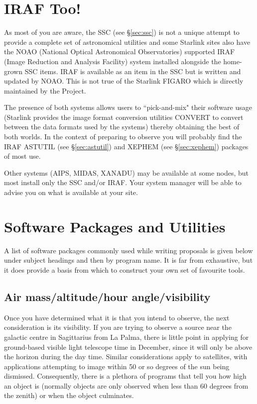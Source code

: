 \documentclass[twoside,11pt]{article}
\newcommand{\htmladdnormallink}[2]{#1}
\newcommand{\xref}[3]{#1}
\newcommand{\xlabel}[1]{}
\newcommand{\AIPSref}{\xref{AIPS}{sun207}{}}
\newcommand{\FIGAROref}{\xref{FIGARO}{sun86}{}}
\newcommand{\IRAFref}{\htmladdnormallink{IRAF}{http://www.starlink.ac.uk/iraf/}}
\newcommand{\NOAOref}{\htmladdnormallink{NOAO}{http://www.noao.edu/}}
\newcommand{\MIDASref}{\htmladdnormallink{MIDAS}{http://http.hq.eso.org/midas-info/midas.html}}
\newcommand{\STARLINKref}{\htmladdnormallink{Starlink}{http://www.starlink.ac.uk/}}
\newcommand{\CONVERTref}{\xref{CONVERT}{sun55}{}}
\newcommand{\SSCref}{\xref{SSC}{sun1}{}}
\newcommand{\XANADUref}{\htmladdnormallink{XANADU}{http://heasarc.gsfc.nasa.gov/docs/xanadu/xanadu.html}}
\begin{document}
\section{IRAF Too!} \xlabel{IRAF}
\label{sec:iraf}

As most of you are aware, the {\SSCref} (see \S{\ref{sec:ssc}}) is not a unique attempt to provide
a complete set of astronomical utilities and some {\STARLINKref} sites also have the
{\NOAOref} (National Optical Astronomical Observatories) supported {\IRAFref}
(Image Reduction and Analysis Facility) system installed alongside the home-grown SSC
items. IRAF is available as an item in the SSC but is written and updated
by NOAO. This is not true of the Starlink {\FIGAROref} which is directly maintained
by the Project.

The presence of both systems allows users to ``pick-and-mix" their
software usage (Starlink provides the image format conversion utilities
{\CONVERTref} to convert between the data formats used by the systems)
thereby obtaining the best of both worlds. In the context
of preparing to observe you will probably find the IRAF ASTUTIL (see \S{\ref{sec:astutil}})
and XEPHEM (see \S{\ref{sec:xephem}}) packages of most use.

Other systems ({\AIPSref}, {\MIDASref}, {\XANADUref}) may be available
at some nodes, but most install only the SSC and/or IRAF. Your system manager
will be able to advise you on what is available at your site.


\section{Software Packages and Utilities} \xlabel{PACKAGES}
\label{sec:packages}

A list of software packages commonly used while writing proposals is given
below under subject headings and then by program name. It is far from
exhaustive, but it does provide a basis from which to construct your own
set of favourite tools.

\subsection{Air mass/altitude/hour angle/visibility} \xlabel{AIRMASS}
\label{sec:airmass}

Once you have determined what it is that you intend to observe, the
next consideration is its visibility. If you are trying to observe
a source near the galactic centre in Sagittarius from La Palma, there is
little point in
applying for ground-based visible light telescope time in December, since
it will only be above the horizon during the day time. Similar
considerations apply to satellites, with applications attempting to image
within 50 or so degrees of the sun being dismissed. Consequently,
there is a plethora of programs that tell you how high an object is
(normally objects are only observed when less than 60 degrees from the
zenith) or when the object culminates.
\end{document}
